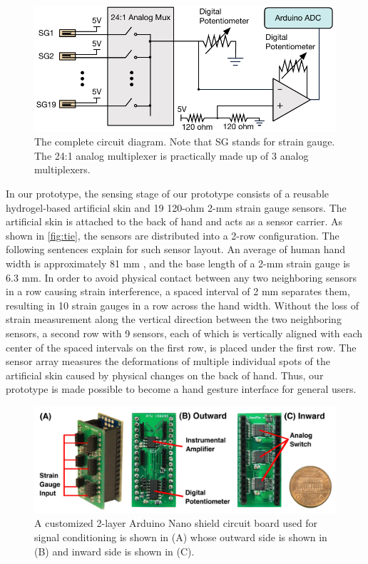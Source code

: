\documentclass{sigchi}
\begin{document}
\begin{figure}[t]
  \includegraphics[width=1\columnwidth]{figures/CompleteDiagram_v3.pdf}
  \caption{The complete circuit diagram. Note that SG stands for strain gauge. The 24:1 analog multiplexer is practically made up of 3 analog multiplexers.}
  \label{fig:completeCircuitDiagram}
\end{figure}

In our prototype, the sensing stage of our prototype consists of a reusable hydrogel-based artificial skin and 19 120-ohm 2-mm strain gauge sensors. The artificial skin is attached to the back of hand and acts as a sensor carrier. As shown in \autoref{fig:tie}, the sensors are distributed into a 2-row configuration. The following sentences explain for such sensor layout. An average of human hand width is approximately 81 mm \cite{Kulaksiz2002257}, and the base length of a 2-mm strain gauge is 6.3 mm. In order to avoid physical contact between any two neighboring sensors in a row causing strain interference, a spaced interval of 2 mm separates them, resulting in 10 strain gauges in a row across the hand width. Without the loss of strain measurement along the vertical direction between the two neighboring sensors, a second row with 9 sensors, each of which is vertically aligned with each center of the spaced intervals on the first row, is placed under the first row. The sensor array measures the deformations of multiple individual spots of the artificial skin caused by physical changes on the back of hand. Thus, our prototype is made possible to become a hand gesture interface for general users.

\begin{figure}[b]
  \begin{center}
  \includegraphics[width=1\columnwidth]{figures/harwareV2.jpg}
  \caption{ A customized 2-layer Arduino Nano shield circuit board used for signal conditioning is shown in (A) whose outward side is shown in (B) and inward side is shown in (C).}
  \label{fig:hardware}
  \end{center}
\end{figure}
\end{document}
